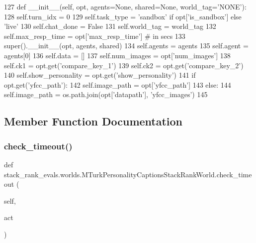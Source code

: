 \begin{DoxyCode}
127     \textcolor{keyword}{def }\_\_init\_\_(self, opt, agents=None, shared=None, world\_tag='NONE'):
128         self.turn\_idx = 0
129         self.task\_type = \textcolor{stringliteral}{'sandbox'} \textcolor{keywordflow}{if} opt[\textcolor{stringliteral}{'is\_sandbox'}] \textcolor{keywordflow}{else} \textcolor{stringliteral}{'live'}
130         self.chat\_done = \textcolor{keyword}{False}
131         self.world\_tag = world\_tag
132         self.max\_resp\_time = opt[\textcolor{stringliteral}{'max\_resp\_time'}]  \textcolor{comment}{# in secs}
133         super().\_\_init\_\_(opt, agents, shared)
134         self.agents = agents
135         self.agent = agents[0]
136         self.data = []
137         self.num\_images = opt[\textcolor{stringliteral}{'num\_images'}]
138         self.ck1 = opt.get(\textcolor{stringliteral}{'compare\_key\_1'})
139         self.ck2 = opt.get(\textcolor{stringliteral}{'compare\_key\_2'})
140         self.show\_personality = opt.get(\textcolor{stringliteral}{'show\_personality'})
141         \textcolor{keywordflow}{if} opt.get(\textcolor{stringliteral}{'yfcc\_path'}):
142             self.image\_path = opt[\textcolor{stringliteral}{'yfcc\_path'}]
143         \textcolor{keywordflow}{else}:
144             self.image\_path = os.path.join(opt[\textcolor{stringliteral}{'datapath'}], \textcolor{stringliteral}{'yfcc\_images'})
145 
\end{DoxyCode}


\subsection{Member Function Documentation}
\mbox{\label{classstack__rank__evals_1_1worlds_1_1MTurkPersonalityCaptionsStackRankWorld_a60ac9e09fd5c55d81fafc0a86794716b}} 
\subsubsection{\texorpdfstring{check\+\_\+timeout()}{check\_timeout()}}
{\footnotesize\ttfamily def stack\+\_\+rank\+\_\+evals.\+worlds.\+M\+Turk\+Personality\+Captions\+Stack\+Rank\+World.\+check\+\_\+timeout (\begin{DoxyParamCaption}\item[{}]{self,  }\item[{}]{act }\end{DoxyParamCaption})}



